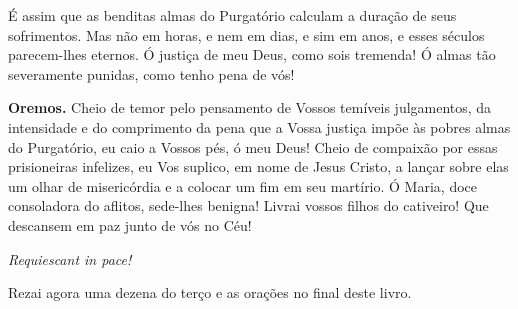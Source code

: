 É assim que as benditas almas do Purgatório calculam a duração de seus sofrimentos. Mas não em horas, e nem em dias, e sim em anos, e esses séculos parecem-lhes eternos. Ó justiça de meu Deus, como sois tremenda! Ó almas tão severamente punidas, como tenho pena de vós!


\vspace{\baselineskip}\noindent \textbf{Oremos.} Cheio de temor pelo pensamento de Vossos temíveis julgamentos, da intensidade e do comprimento da pena que a Vossa justiça impõe às pobres almas do Purgatório, eu caio a Vossos pés, ó meu Deus! Cheio de compaixão por essas prisioneiras infelizes, eu Vos suplico, em nome de Jesus Cristo, a lançar sobre elas um olhar de misericórdia e a colocar um fim em seu martírio. Ó Maria, doce consoladora do aflitos, sede-lhes benigna! Livrai vossos filhos do cativeiro! Que descansem em paz junto de vós no Céu!



\begin{center}
\textit{Requiescant in pace!}
\end{center}

Rezai agora uma dezena do terço e as orações no final deste livro.

